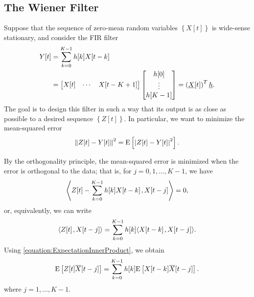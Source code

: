 \subsection{The Wiener Filter}

Suppose that the sequence of zero-mean random variables $\left\{ X[t] \right\}$ is wide-sense stationary, and consider the FIR filter
\begin{equation*}
\begin{split}
Y[t] &= \sum_{k=0}^{K-1} h[k] X[t - k] \\
&= \begin{bmatrix} X[t] & \cdots & X[t-K+1] \end{bmatrix}
\begin{bmatrix} h[0] \\ \vdots \\ h[K-1] \end{bmatrix}
= \left( \underline{X}[t] \right)^T \underline{h} .
\end{split}
\end{equation*}
The goal is to design this filter in such a way that its output is as close as possible to a desired sequence $\left\{ Z[t] \right\}$.
In particular, we want to minimize the mean-squared error
\begin{equation*}
\left\| Z[t] - Y[t] \right\|^2
= \mathrm{E} \left[ \left| Z[t] - Y[t] \right|^2 \right].
\end{equation*}

By the orthogonality principle, the mean-squared error is minimized when the error is orthogonal to the data; that is, for $j = 0, 1, \ldots, K-1$, we have
\begin{equation*}
{\left\langle  Z[t] - \sum_{k=0}^{K-1} h[k] X[t - k]  \mskip2mu ,  X[t - j]  \right\rangle} = 0,
\end{equation*}
or, equivalently, we can write
\begin{equation*}
{\left\langle  Z[t]  \mskip2mu ,  X[t - j]  \right\rangle}
= \sum_{k=0}^{K-1} h[k] {\left\langle  X[t - k]  \mskip2mu ,  X[t - j]  \right\rangle} .
\end{equation*}
Using \eqref{equation:ExpectationInnerProduct}, we obtain
\begin{equation} \label{equation:WienerHopfConditions}
\mathrm{E} \left[ Z[t] \overline{X}[t - j] \right]
= \sum_{k=0}^{K-1} h[k] \mathrm{E} \left[ X[t - k] \overline{X}[t - j] \right] .
\end{equation}
where $j = 1, \ldots, K-1$.

